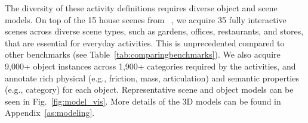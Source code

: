 
The diversity of these activity definitions requires diverse object and scene models. %
On top of the 15 house scenes from \oldbenchmark~\cite{srivastava2021behavior}, we acquire 35 fully interactive scenes across diverse scene types, such as gardens, offices, restaurants, and stores, that are essential for everyday activities. This is unprecedented compared to other benchmarks (see Table~\ref{tab:comparingbenchmarks}). We also acquire 9,000+ object instances across 1,900+ categories required by the activities, and annotate rich physical (e.g., friction, mass, articulation) and semantic properties (e.g., category) for each object. Representative scene and object models can be seen in Fig.~\ref{fig:model_vis}. More details of the 3D models can be found in Appendix~\ref{as:modeling}.









